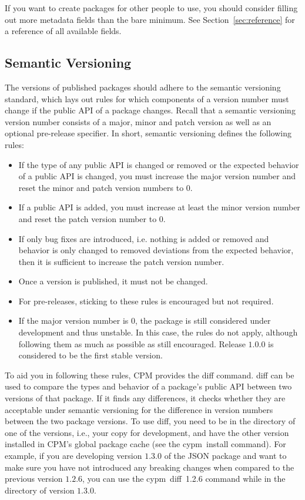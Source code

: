 \documentclass[11pt]{article}
\renewcommand{\tt}{\usefont{OT1}{cmtt}{m}{n}\selectfont}
\newcommand{\codefont}{\small\tt}
\newcommand{\code}[1]{\mbox{\codefont #1}}
\begin{document}
If you want to create packages for other people to use, you should consider 
filling out more metadata fields than the bare minimum. See 
Section~\ref{sec:reference} for a reference of all available fields.

\subsection{Semantic Versioning}
\label{sec:semantic-versioning}

The versions of published packages should adhere to the semantic versioning 
standard, which lays out rules for which components of a version number must
change if the public API of a package changes. Recall that a semantic versioning 
version number consists of a major, minor and patch version as well as an 
optional pre-release specifier. In short, semantic versioning defines the 
following rules:

\begin{itemize}
\item If the type of any public API is changed or removed or the expected 
behavior of a public API is changed, you must increase the major version number
and reset the minor and patch version numbers to $0$.

\item If a public API is added, you must increase at least the minor version
number and reset the patch version number to $0$.

\item If only bug fixes are introduced, i.e. nothing is added or removed and
behavior is only changed to removed deviations from the expected behavior, then
it is sufficient to increase the patch version number.

\item Once a version is published, it must not be changed.

\item For pre-releases, sticking to these rules is encouraged but not required.

\item If the major version number is $0$, the package is still considered under
development and thus unstable. In this case, the rules do not apply, although
following them as much as possible as still encouraged. Release $1.0.0$ is 
considered to be the first stable version.
\end{itemize}
%
To aid you in following these rules, CPM provides the \code{diff} command.
\code{diff} can be used to compare the types and behavior of a package's public
API between two versions of that package. If it finds any differences, it checks
whether they are acceptable under semantic versioning for the difference in 
version numbers between the two package versions. To use \code{diff}, you need
to be in the directory of one of the versions, i.e., your copy for development,
and have the other version installed in CPM's global package cache (see the
\code{cypm install} command). For example, if you are developing version $1.3.0$
of the JSON package and want to make sure you have not introduced any breaking
changes when compared to the previous version $1.2.6$, you can use the 
\code{cypm diff 1.2.6} command while in the directory of version $1.3.0$. 
\end{document}
